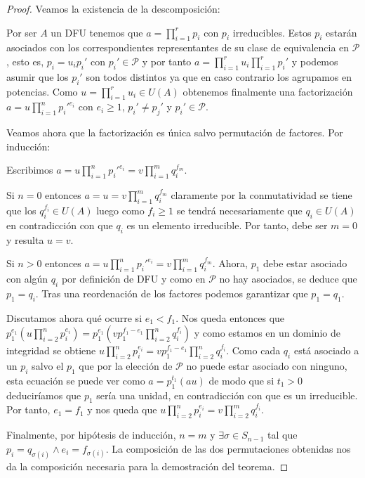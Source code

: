 \begin{proof}
Veamos la existencia de la descomposición:

Por ser $A$ un DFU tenemos que $a = \prod_{i = 1}^r p_i$ con $p_i$ irreducibles. Estos $p_i$ estarán asociados con los correspondientes representantes de su clase de equivalencia en $\mathcal{P}$, esto es, $p_i = u_i p_i'$ con $p_i' \in \mathcal{P}$ y por tanto $a = \prod_{i = 1}^r u_i \prod_{i = 1}^r p_i'$ y podemos asumir que los $p_i'$ son todos distintos ya que en caso contrario los agrupamos en potencias. Como $u = \prod_{i = 1}^r u_i \in U(A)$ obtenemos finalmente una factorización $a = u \prod_{i = 1}^n p_i'^{e_i}$ con $e_i \ge 1$, $p_i' \neq p_j'$ y $p_i' \in \mathcal{P}$. 

Veamos ahora que la factorización es única salvo permutación de factores. Por inducción:

Escribimos $a = u \prod_{i = 1}^n p_i'^{e_i} = v \prod_{i = 1}^m q_i^{f_m}$. 

Si $n = 0$ entonces $a = u = v \prod_{i = 1}^m q_i^{f_m}$ claramente por la conmutatividad se tiene que los $q_i^{f_i} \in U(A)$ luego como $f_i \ge 1$ se tendrá necesariamente que $q_i \in U(A)$ en contradicción con que $q_i$ es un elemento irreducible. Por tanto, debe ser $m = 0$ y resulta $u = v$. 

Si $n > 0$ entonces $a = u \prod_{i = 1}^n p_i'^{e_i} = v \prod_{i = 1}^m q_i^{f_m}$. Ahora, $p_1$ debe estar asociado con algún $q_i$ por definición de DFU y como en $\mathcal{P}$ no hay asociados, se deduce que $p_1 = q_i$. Tras una reordenación de los factores podemos garantizar que $p_1 = q_1$. 

Discutamos ahora qué ocurre si $e_1 < f_1$. Nos queda entonces que $p_1^{e_1}(u \prod_{i = 2}^n p_i^{e_i}) = p_1^{e_1}(vp_1^{f_1-e_1}  \prod_{i = 2}^n q_i^{f_i})$ y como estamos en un dominio de integridad se obtiene $u \prod_{i = 2}^n p_i^{e_i} = v p_1^{f_1-e_1} \prod_{i = 2}^n q_i^{f_i}$. Como cada $q_i$ está asociado a un $p_i$ salvo el $p_1$ que por la elección de $\mathcal{P}$ no puede estar asociado con ninguno, esta ecuación se puede ver como $a = p_1^{t_1} (au)$ de modo que si $t_1 > 0$ deduciríamos que $p_1$ sería una unidad, en contradicción con que es un irreducible. Por tanto, $e_1 = f_1$ y nos queda que $u \prod_{i = 2}^n p_i^{e_i} = v \prod_{i = 2}^m q_i^{f_i}$. 

Finalmente, por hipótesis de inducción, $n = m$ y $\exists \sigma \in S_{n-1}$ tal que $p_i = q_{\sigma(i)} \land e_i = f_{\sigma(i)}$. La composición de las dos permutaciones obtenidas nos da la composición necesaria para la demostración del teorema. 
\end{proof}

